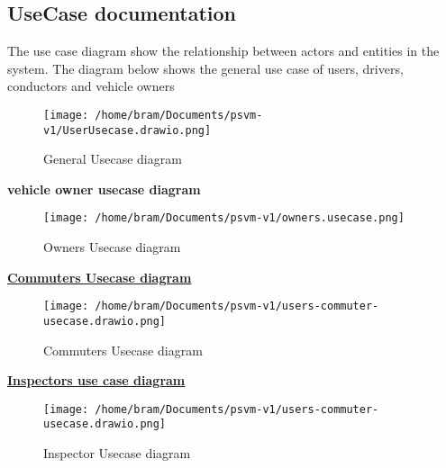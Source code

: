 \documentclass[a4paper, 12pt]{report}
\begin{document}
\subsection{UseCase documentation}
\noindent The use case diagram show the relationship between actors and entities in the system. The diagram below shows the general use case of users, drivers, conductors and vehicle owners
\begin{figure}[h] %
  \centering
  \texttt{[image: /home/bram/Documents/psvm-v1/UserUsecase.drawio.png]} %
  \caption{General Usecase diagram} %
  \label{fig:General usecase diagram} %
\end{figure}
\par
\textbf{vehicle owner usecase diagram}
\begin{figure}[h] %
  \centering
  \texttt{[image: /home/bram/Documents/psvm-v1/owners.usecase.png]} %
  \caption{Owners Usecase diagram} %
  \label{fig:vehicle owners usecase diagram} %
\end{figure}
\par 
\textbf{\underline{Commuters Usecase diagram}}
\begin{figure}[h] %
  \centering
  \texttt{[image: /home/bram/Documents/psvm-v1/users-commuter-usecase.drawio.png]} %
  \caption{Commuters Usecase diagram} %
  \label{fig:Comuters usecase diagram} %
\end{figure}
\clearpage
\textbf{\underline{Inspectors use case diagram}}\par
\begin{figure}[h] %
  \centering
  \texttt{[image: /home/bram/Documents/psvm-v1/users-commuter-usecase.drawio.png]} %
  \caption{Inspector Usecase diagram} %
  \label{fig:Inspector usecase diagram} %
\end{figure}
\end{document}

